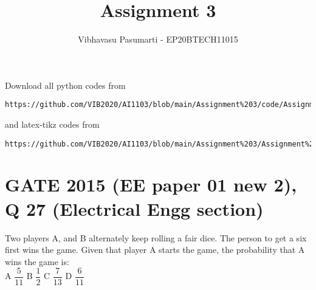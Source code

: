 \documentclass[journal,12pt,twocolumn]{IEEEtran}
\theoremstyle{definition}
\numberwithin{equation}{subsection}
\renewcommand{\thefigure}{\theproblem}
\begin{document}
\title{Assignment 3}
\author{Vibhavasu Pasumarti - EP20BTECH11015}
\maketitle
\newpage
\bigskip
\renewcommand{\thefigure}{\theenumi}
\renewcommand{\thetable}{\theenumi}
Download all python codes from 
\begin{lstlisting}
https://github.com/VIB2020/AI1103/blob/main/Assignment%203/code/Assignment%203.py
\end{lstlisting}
%
and latex-tikz codes from 
%
\begin{lstlisting}
https://github.com/VIB2020/AI1103/blob/main/Assignment%203/Assignment%203.pdf
\end{lstlisting}
\section{\large GATE 2015 (EE paper 01 new 2), Q 27 (Electrical Engg section)}
Two players A, and B alternately keep rolling a fair dice. The person to get a six first wins the game. Given that player A starts the game, the probability that A wins the game is:\\[5pt]
    A $\dfrac{5}{11}$ \hspace{1cm}
    B $\dfrac{1}{2}$ \hspace{1cm}
    C $\dfrac{7}{13}$ \hspace{1cm}
    D $\dfrac{6}{11}$ \hspace{1cm}
\end{document}
